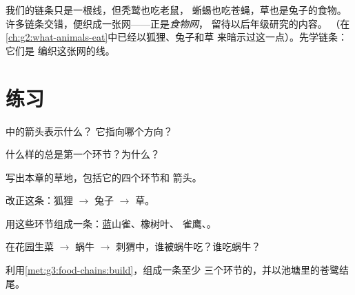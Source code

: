 \begin{remark}[真实的草地是食物网]\label{rem:g3:food-chains:web}
我们的链条只是一根线，但秃鹫也吃老鼠，
蜥蜴也吃苍蝇，草也是兔子的食物。
许多链条交错，便织成一张网——正是\emph{食物网}，
留待以后年级研究的内容。
（在\cref{ch:g2:what-animals-eat}中已经以狐狸、兔子和草
来暗示过这一点）。先学链条：它们是
编织这张网的线。
\end{remark}

\section{练习}

\begin{exercise}[$\star$]\label{exo:g3:food-chains:1}
中的箭头表示什么？
它指向哪个方向？
\end{exercise}

\begin{exercise}[$\star$]\label{exo:g3:food-chains:2}
什么样的总是第一个环节？为什么？
\end{exercise}

\begin{exercise}[$\star$]\label{exo:g3:food-chains:3}
写出本章的草地，包括它的四个环节和
箭头。
\end{exercise}

\begin{exercise}[$\star$]\label{exo:g3:food-chains:4}
改正这条：狐狸 $\rightarrow$ 兔子 $\rightarrow$
草。
\end{exercise}

\begin{exercise}[$\star$]\label{exo:g3:food-chains:5}
用这些环节组成一条：蓝山雀、橡树叶、
雀鹰、。
\end{exercise}

\begin{exercise}[$\star$]\label{exo:g3:food-chains:6}
在花园生菜 $\rightarrow$ 蜗牛 $\rightarrow$
刺猬中，谁被蜗牛吃？谁吃蜗牛？
\end{exercise}

\begin{exercise}[$\star$]\label{exo:g3:food-chains:7}
利用\cref{met:g3:food-chains:build}，组成一条至少
三个环节的，并以池塘里的苍鹭结尾。
\end{exercise}

